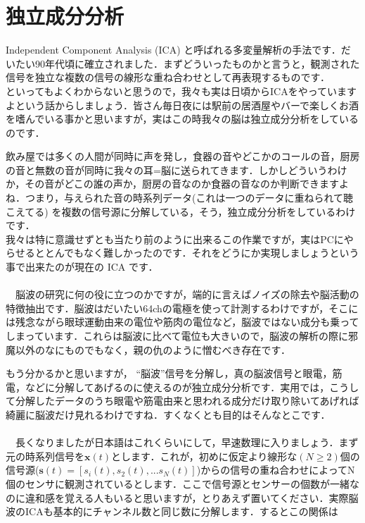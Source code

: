 \documentclass[11pt,a4paper,uplatex]{ujreport}
\begin{document}
\section{独立成分分析}
Independent Component Analysis (ICA) と呼ばれる多変量解析の手法です．だいたい90年代頃に確立されました．まずどういったものかと言うと，観測された信号を独立な複数の信号の線形な重ね合わせとして再表現するものです．\\

といってもよくわからないと思うので，我々も実は日頃からICAをやっていますよという話からしましょう．皆さん毎日夜には駅前の居酒屋やバーで楽しくお酒を嗜んでいる事かと思いますが，実はこの時我々の脳は独立成分分析をしているのです．

飲み屋では多くの人間が同時に声を発し，食器の音やどこかのコールの音，厨房の音と無数の音が同時に我々の耳=脳に送られてきます．しかしどういうわけか，その音がどこの誰の声か，厨房の音なのか食器の音なのか判断できますよね．つまり，与えられた音の時系列データ(これは一つのデータに重ねられて聴こえてる) を複数の信号源に分解している，そう，独立成分分析をしているわけです．\\

我々は特に意識せずとも当たり前のように出来るこの作業ですが，実はPCにやらせるととんでもなく難しかったのです．それをどうにか実現しましょうという事で出来たのが現在の ICA です．\\
\\
　脳波の研究に何の役に立つのかですが，端的に言えばノイズの除去や脳活動の特徴抽出です．脳波はだいたい64chの電極を使って計測するわけですが，そこには残念ながら眼球運動由来の電位や筋肉の電位など，脳波ではない成分も乗ってしまっています．これらは脳波に比べて電位も大きいので，脳波の解析の際に邪魔以外のなにものでもなく，親の仇のように憎むべき存在です．

もう分かるかと思いますが， ``脳波''信号を分解し，真の脳波信号と眼電，筋電，などに分解してあげるのに使えるのが独立成分分析です．実用では，こうして分解したデータのうち眼電や筋電由来と思われる成分だけ取り除いてあげれば綺麗に脳波だけ見れるわけですね．すくなくとも目的はそんなとこです．\\
\\

　長くなりましたが日本語はこれくらいにして，早速数理に入りましょう．まず元の時系列信号を$\mathbf{x}(t)$とします．これが，初めに仮定より線形な$(N \geq 2)$個の信号源($\mathbf{s}(t)=[s_i(t), s_2(t),...s_N(t)]$)からの信号の重ね合わせによってN個のセンサに観測されているとします．ここで信号源とセンサーの個数が一緒なのに違和感を覚える人もいると思いますが，とりあえず置いてください．実際脳波のICAも基本的にチャンネル数と同じ数に分解します．するとこの関係は
\end{document}
